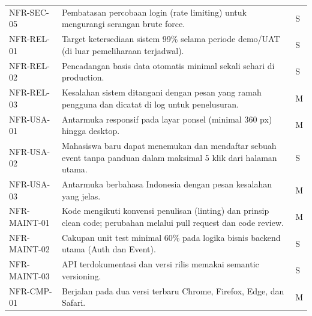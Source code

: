 \documentclass[11pt,a4paper]{article}
\begin{document}
\begin{longtable}{p{3cm}p{10.5cm}p{.5cm}}
NFR-SEC-05 & Pembatasan percobaan login (rate limiting) untuk mengurangi serangan brute force. & S\\
NFR-REL-01 & Target ketersediaan sistem 99\% selama periode demo/UAT (di luar pemeliharaan terjadwal). & S\\
NFR-REL-02 & Pencadangan basis data otomatis minimal sekali sehari di production. & S\\
NFR-REL-03 & Kesalahan sistem ditangani dengan pesan yang ramah pengguna dan dicatat di log untuk penelusuran. & M\\
NFR-USA-01 & Antarmuka responsif pada layar ponsel (minimal 360 px) hingga desktop. & M\\
NFR-USA-02 & Mahasiswa baru dapat menemukan dan mendaftar sebuah event tanpa panduan dalam maksimal 5 klik dari halaman utama. & S\\
NFR-USA-03 & Antarmuka berbahasa Indonesia dengan pesan kesalahan yang jelas. & M\\
NFR-MAINT-01 & Kode mengikuti konvensi penulisan (linting) dan prinsip clean code; perubahan melalui pull request dan code review. & M\\
NFR-MAINT-02 & Cakupan unit test minimal 60\% pada logika bisnis backend utama (Auth dan Event). & S\\
NFR-MAINT-03 & API terdokumentasi dan versi rilis memakai semantic versioning. & S\\
NFR-CMP-01 & Berjalan pada dua versi terbaru Chrome, Firefox, Edge, dan Safari. & M\\
\end{longtable}\normalsize
\end{document}

